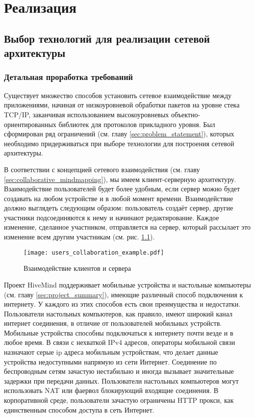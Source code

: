 \newpage

\chapter{Реализация}
\label{ch:chapter_2}

\section{Выбор технологий для реализации сетевой архитектуры}

\subsection{Детальная проработка требований}
\label{sec:detailed_requirements}
Существует множество способов установить сетевое взаимодействие между
приложениями, начиная от низкоуровневой обработки пакетов на уровне стека
TCP/IP, заканчивая использованием высокоуровневых объектно-ориентированных
библиотек для протоколов прикладного уровня. Был сформирован ряд ограничений
(см. главу \ref{sec:problem_statement}), которых необходимо придерживаться при
выборе технологии для построения сетевой архитектуры.

В соответствии с концепцией сетевого взаимодействия (см. главу
\ref{sec:collaborative_mindmapping}), мы имеем клиент-серверную архитектуру.
Взаимодействие пользователей будет более удобным, если сервер можно будет
создавать на любом устройстве и в любой момент времени. Взаимодействие должно
выглядеть следующим образом: пользователь создаёт сервер, другие участники
подсоединяются к нему и начинают редактирование. Каждое изменение, сделанное
участником, отправляется на сервер, который рассылает это изменение всем другим
участникам (см. рис. \ref{img:users_collaboration_example}).

\begin{figure}[!h]
  \centering
  \texttt{[image: users\_collaboration\_example.pdf]}
  \caption{Взаимодействие клиентов и сервера}
  \label{img:users_collaboration_example}
\end{figure} 

Проект HiveMind поддерживает мобильные устройства и настольные компьютеры (см.
главу \ref{sec:project_summary}), имеющие различный способ подключения к
интернету. У каждого из этих способов есть свои преимущества и
недостатки. Пользователи настольных компьютеров, как правило, имеют широкий
канал интернет соединения, в отличие от пользователей мобильных устройств.
Мобильные устройства способны подключаться к интернету почти везде и в любое
время. В связи с нехваткой IPv4 адресов, операторы мобильной связи назначают
серые ip адреса мобильным устройствам, что делает данные устройства недоступными
напрямую из сети Интернет. Соединение по беспроводным сетям зачастую нестабильно
и иногда вызывает значительные задержки при передачи данных. Пользователи
настольных компьютеров могут использовать NAT или фаервол блокирующий
входящие соединения. В корпоративной среде, пользователи зачастую ограничены
HTTP прокси, как единственным способом доступа в сеть Интернет.

